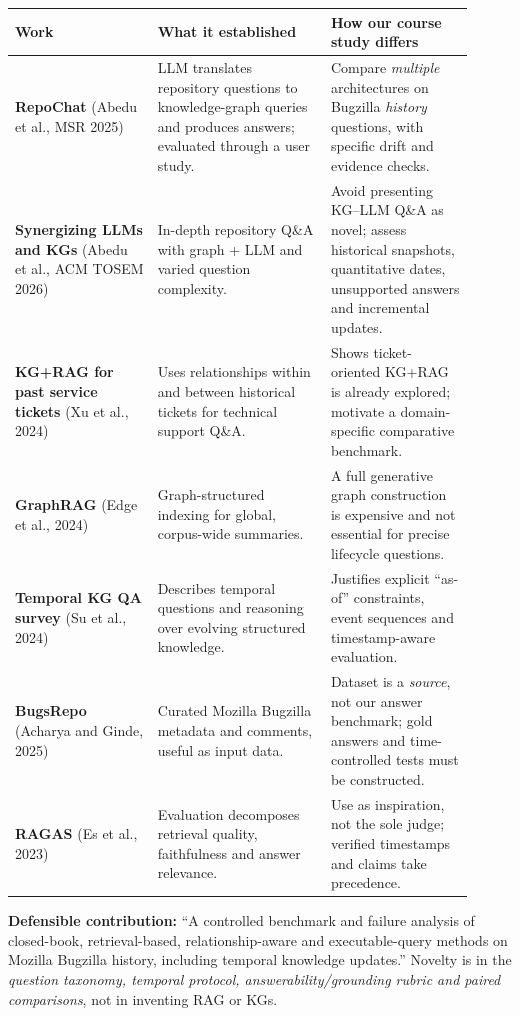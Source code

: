 \documentclass[11pt,a4paper]{article}
\begin{document}
\begin{longtable}{@{}p{0.28\linewidth}p{0.34\linewidth}p{0.29\linewidth}@{}}
\toprule \textbf{Work}&\textbf{What it established}&\textbf{How our course study differs}\\\midrule\endhead
\textbf{RepoChat} (Abedu et al., MSR 2025)\cite{repochat}&LLM translates repository questions to knowledge-graph queries and produces answers; evaluated through a user study.&Compare \emph{multiple} architectures on Bugzilla \emph{history} questions, with specific drift and evidence checks.\\
\textbf{Synergizing LLMs and KGs} (Abedu et al., ACM TOSEM 2026)\cite{abedu}&In-depth repository Q\&A with graph + LLM and varied question complexity.&Avoid presenting KG--LLM Q\&A as novel; assess historical snapshots, quantitative dates, unsupported answers and incremental updates.\\
\textbf{KG+RAG for past service tickets} (Xu et al., 2024)\cite{xukgrag}&Uses relationships within and between historical tickets for technical support Q\&A.&Shows ticket-oriented KG+RAG is already explored; motivate a domain-specific comparative benchmark.\\
\textbf{GraphRAG} (Edge et al., 2024)\cite{edgerag}&Graph-structured indexing for global, corpus-wide summaries.&A full generative graph construction is expensive and not essential for precise lifecycle questions.\\
\textbf{Temporal KG QA survey} (Su et al., 2024)\cite{temporalkg}&Describes temporal questions and reasoning over evolving structured knowledge.&Justifies explicit ``as-of'' constraints, event sequences and timestamp-aware evaluation.\\
\textbf{BugsRepo} (Acharya and Ginde, 2025)\cite{bugsrepo}&Curated Mozilla Bugzilla metadata and comments, useful as input data.&Dataset is a \emph{source}, not our answer benchmark; gold answers and time-controlled tests must be constructed.\\
\textbf{RAGAS} (Es et al., 2023)\cite{ragas}&Evaluation decomposes retrieval quality, faithfulness and answer relevance.&Use as inspiration, not the sole judge; verified timestamps and claims take precedence.\\
\bottomrule
\end{longtable}

\textbf{Defensible contribution:} ``A controlled benchmark and failure analysis of closed-book, retrieval-based, relationship-aware and executable-query methods on Mozilla Bugzilla history, including temporal knowledge updates.'' Novelty is in the \emph{question taxonomy, temporal protocol, answerability/grounding rubric and paired comparisons}, not in inventing RAG or KGs.
\end{document}

